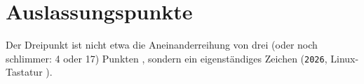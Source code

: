 
\section{Auslassungspunkte}

Der Dreipunkt  ist nicht etwa die Aneinanderreihung von
drei (oder noch schlimmer: 4 oder 17) Punkten , sondern ein eigenständiges
Zeichen (\texttt{2026}, Linux-Tastatur ).
